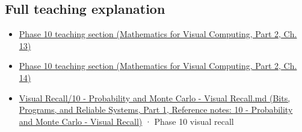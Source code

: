 \subsection{Full teaching explanation}\label{appendix-6a7869dd79a6-full-teaching-explanation}

\hypertarget{appendix-6a7869dd79a6-full-teaching-explanation}{}

\begin{itemize}
\tightlist
\item
  \href{../02-Mathematics-for-Visual-Computing-P02/main.pdf\#02-foundations-ii-ch029-a-computer-produces-deterministic-pseudorandom-sequences}{Phase 10 teaching section (Mathematics for Visual Computing, Part 2, Ch. 13)}
\item
  \href{../02-Mathematics-for-Visual-Computing-P02/main.pdf\#02-foundations-ii-ch030-monte-carlo-estimates-trade-computation-for-uncertainty}{Phase 10 teaching section (Mathematics for Visual Computing, Part 2, Ch. 14)}
\item
  \href{../01-Bits-Programs-and-Reliable-Systems-P01/main.pdf\#appendix-cb5af353ef77}{Visual Recall/10 - Probability and Monte Carlo - Visual Recall.md (Bits, Programs, and Reliable Systems, Part 1, Reference notes: 10 - Probability and Monte Carlo - Visual Recall)} · Phase 10 visual recall
\end{itemize}
